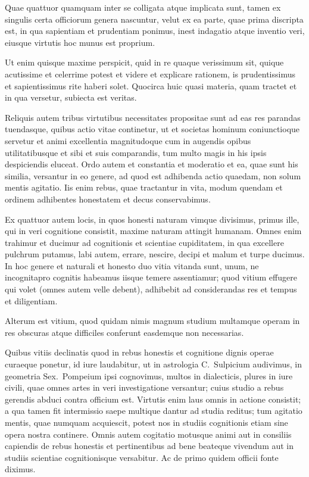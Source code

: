 Quae quattuor quamquam inter se colligata atque implicata sunt, tamen ex singulis certa officiorum genera nascuntur, velut ex ea parte, quae prima discripta est, in qua sapientiam et prudentiam ponimus, inest indagatio atque inventio veri, eiusque virtutis hoc munus est proprium.


 Ut enim quisque maxime perspicit, quid in re quaque verissimum sit, quique acutissime et celerrime potest et videre et explicare rationem, is prudentissimus et sapientissimus rite haberi solet. Quocirca huic quasi materia, quam tractet et in qua versetur, subiecta est veritas.

 Reliquis autem tribus virtutibus necessitates propositae sunt ad eas res parandas tuendasque, quibus actio vitae continetur, ut et societas hominum coniunctioque servetur et animi excellentia magnitudoque cum in augendis opibus utilitatibusque et sibi et suis comparandis, tum multo magis in his ipsis despiciendis eluceat. Ordo autem et constantia et moderatio et ea, quae sunt his similia, versantur in eo genere, ad quod est adhibenda actio quaedam, non solum mentis agitatio. Iis enim rebus, quae tractantur in vita, modum quendam et ordinem adhibentes honestatem et decus conservabimus.
 

 Ex quattuor autem locis, in quos honesti naturam vimque divisimus, primus ille, qui in veri cognitione consistit, maxime naturam attingit humanam. Omnes enim trahimur et ducimur ad cognitionis et scientiae cupiditatem, in qua excellere pulchrum putamus, labi autem, errare, nescire, decipi et malum et turpe ducimus. In hoc genere et naturali et honesto duo vitia vitanda sunt, unum, ne incognitapro cognitis habeamus iisque temere assentiamur; quod vitium effugere qui volet (omnes autem velle debent), adhibebit ad considerandas res et tempus et diligentiam.


 Alterum est vitium, quod quidam nimis magnum studium multamque operam in res obscuras atque difficiles conferunt easdemque non necessarias.

Quibus vitiis declinatis quod in rebus honestis et cognitione dignis operae curaeque ponetur, id iure laudabitur, ut in astrologia C.~Sulpicium audivimus, in geometria Sex.~Pompeium ipsi cognovimus, multos in dialecticis, plures in iure civili, quae omnes artes in veri investigatione versantur; cuius studio a rebus gerendis abduci contra officium est. Virtutis enim laus omnis in actione consistit; a qua tamen fit intermissio saepe multique dantur ad studia reditus; tum agitatio mentis, quae numquam acquiescit, potest nos in studiis cognitionis etiam sine opera nostra continere. Omnis autem cogitatio motusque animi aut in consiliis capiendis de rebus honestis et pertinentibus ad bene beateque vivendum aut in studiis scientiae cognitionisque versabitur.
Ac de primo quidem officii fonte diximus.
 


